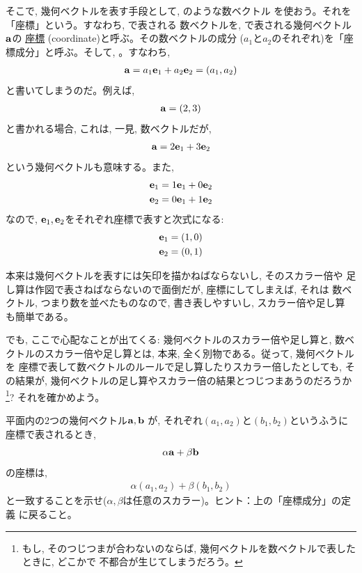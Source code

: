 そこで, 幾何ベクトルを表す手段として, のような数ベクトル
を使おう。それを「座標」という。すなわち, で表される
数ベクトルを, で表される幾何ベクトル${\bf a}$の
\underline{座標}  (coordinate)と呼ぶ。その数ベクトルの成分
($a_1$と$a_2$のそれぞれ)を「座標成分」と呼ぶ。そして, 。すなわち, 
\begin{eqnarray}
{\bf a}=a_1{\bf e}_1+a_2{\bf e}_2=(a_1, a_2)\label{eq:vect_alg_num}
\end{eqnarray}
と書いてしまうのだ。例えば, 
\begin{eqnarray}
{\bf a}=(2, 3)
\end{eqnarray}
と書かれる場合, これは, 一見, 数ベクトルだが, 
\begin{eqnarray}
{\bf a}=2{\bf e}_1 + 3 {\bf e}_2
\end{eqnarray}
という幾何ベクトルも意味する。また, 
\begin{eqnarray*}
{\bf e}_1=1{\bf e}_1+0{\bf e}_2\\
{\bf e}_2=0{\bf e}_1+1{\bf e}_2
\end{eqnarray*}
なので, ${\bf e}_1, {\bf e}_2$をそれぞれ座標で表すと次式になる:
\begin{eqnarray}
{\bf e}_1=(1, 0)\\
{\bf e}_2=(0, 1)
\end{eqnarray}

本来は幾何ベクトルを表すには矢印を描かねばならないし, そのスカラー倍や
足し算は作図で表さねばならないので面倒だが, 座標にしてしまえば, それは
数ベクトル, つまり数を並べたものなので, 書き表しやすいし, スカラー倍や足し算
も簡単である。

でも, ここで心配なことが出てくる: 幾何ベクトルのスカラー倍や足し算と, 
数ベクトルのスカラー倍や足し算とは, 本来, 全く別物である。従って, 幾何ベクトルを
座標で表して数ベクトルのルールで足し算したりスカラー倍したとしても, 
その結果が, 幾何ベクトルの足し算やスカラー倍の結果とつじつまあうのだろうか\footnote{もし, 
そのつじつまが合わないのならば, 幾何ベクトルを数ベクトルで表したときに, どこかで
不都合が生じてしまうだろう。}? それを確かめよう。\hv

\begin{q}\label{q:vect_add_2D} 平面内の2つの幾何ベクトル${\bf a}, {\bf b}$
が, それぞれ$(a_1,a_2)$と$(b_1,b_2)$というふうに座標で表されるとき, 
\begin{eqnarray}\alpha {\bf a}+\beta {\bf b}\end{eqnarray}
の座標は, 
\begin{eqnarray}\alpha (a_1,a_2) + \beta (b_1,b_2)\end{eqnarray}
と一致することを示せ($\alpha, \beta$は任意のスカラー)。ヒント：上の「座標成分」の定義
に戻ること。
\end{q}\vspace{0.3cm}

